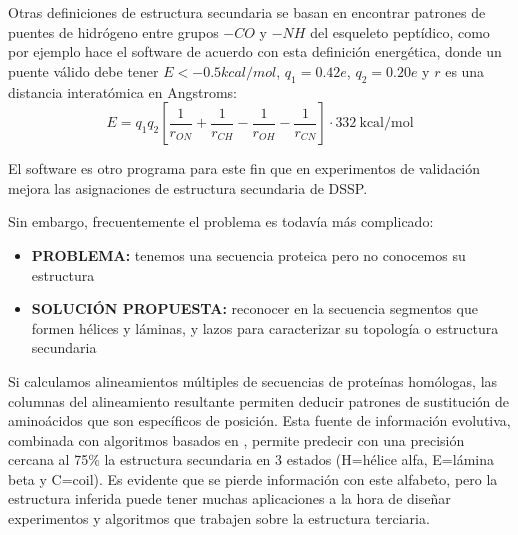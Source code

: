 
Otras definiciones de estructura secundaria se basan en encontrar patrones de puentes de 
hidr\'{o}geno entre grupos $-CO$ y $-NH$ del esqueleto pept\'{i}dico, 
como por ejemplo hace el software  \citep{Kabsch1983}
de acuerdo con esta definici\'{o}n energ\'{e}tica, donde un puente v\'{a}lido debe tener $E<-0{.}5 kcal/mol$, 
$q_{1}=0.42e$, $q_{2}=0.20e$ y $r$ es una distancia interat\'{o}mica en Angstroms:
\begin{equation}
E = q_{1} q_{2} \left[ \frac{1}{r_{ON}} + \frac{1}{r_{CH}} - \frac{1}{r_{OH}} - \frac{1}{r_{CN}} \right] \cdot 332 \ \mathrm{kcal/mol}
\label{eq:dssp}
\end{equation}

El software  \citep{Frishman1995} es otro programa para este fin 
que en experimentos de validaci\'{o}n mejora las asignaciones de estructura secundaria de DSSP.

Sin embargo, frecuentemente el problema es todav\'{i}a m\'{a}s complicado:
\begin{itemize}
\item \textbf{PROBLEMA:} tenemos una secuencia proteica pero no conocemos su estructura 
\item \textbf{SOLUCI\'{O}N PROPUESTA:} reconocer en la secuencia segmentos que formen h\'{e}lices y l\'{a}minas, y lazos 
para caracterizar su topolog\'{i}a o estructura secundaria 
\end{itemize} 

Si calculamos alineamientos m\'{u}ltiples de secuencias de prote\'{i}nas hom\'{o}logas,
las columnas del alineamiento resultante permiten deducir patrones de sustituci\'{o}n de amino\'{a}cidos
que son espec\'{i}ficos de posici\'{o}n. Esta fuente de informaci\'{o}n evolutiva,
combinada con algoritmos basados en ,
permite predecir con una precisi\'{o}n cercana al 75\% la estructura secundaria en 3 estados (H=h\'{e}lice alfa, E=l\'{a}mina beta y C=coil).
Es evidente que se pierde informaci\'{o}n con este alfabeto, pero la estructura inferida puede tener muchas aplicaciones a la hora de dise\~nar 
experimentos y algoritmos que trabajen sobre la estructura terciaria. 

